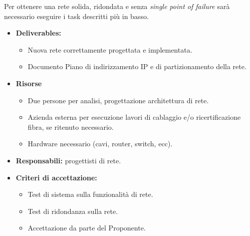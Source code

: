                    
                    Per ottenere una rete solida, ridondata e senza \textit{single point of failure} sarà necessario eseguire i task descritti più in basso.
                    
                    \begin{itemize}
               		\item  \textbf{Deliverables:} 
                    \begin{itemize}
                    	\item Nuova rete correttamente progettata e implementata.
                        \item Documento Piano di indirizzamento IP e di partizionamento della rete.
                    \end{itemize}
                   
                    \item  \textbf{Risorse} 
                    \begin{itemize}
                    	\item Due persone per analisi, progettazione architettura di rete.
                        \item Azienda esterna per esecuzione lavori di cablaggio e/o ricertificazione fibra, se ritenuto necessario.
						\item Hardware necessario (cavi, router, switch, ecc).
                	\end{itemize}
                    \item  \textbf{Responsabili:} progettisti di rete.
                    \item  \textbf{Criteri di accettazione:} 
                    \begin{itemize}
                    	\item Test di sistema sulla funzionalità di rete.
                        \item Test di ridondanza sulla rete.
                        \item Accettazione da parte del Proponente.
                    \end{itemize}
                	\end{itemize}
                    
